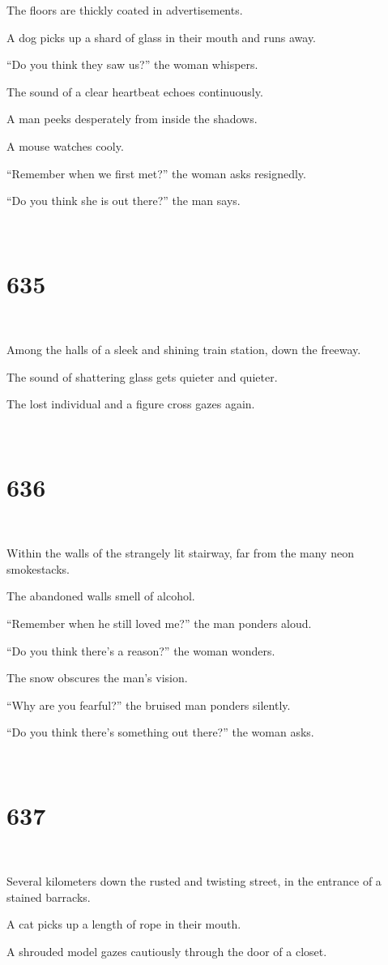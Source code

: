 \documentclass{report}
\begin{document}
The floors are thickly coated in advertisements.

A dog picks up a shard of glass in their mouth and runs away.

``Do you think they saw us?'' the woman whispers.

The sound of a clear heartbeat echoes continuously.

A man peeks desperately from inside the shadows.

A mouse watches cooly.

``Remember when we first met?'' the woman asks resignedly.

``Do you think she is out there?'' the man says.

~
\chapter*{635}
~

Among the halls of a sleek and shining train station, down the freeway.

The sound of shattering glass gets quieter and quieter.

The lost individual and a figure cross gazes again.

~
\chapter*{636}
~

Within the walls of the strangely lit stairway, far from the many neon smokestacks.

The abandoned walls smell of alcohol.

``Remember when he still loved me?'' the man ponders aloud.

``Do you think there's a reason?'' the woman wonders.

The snow obscures the man's vision.

``Why are you fearful?'' the bruised man ponders silently.

``Do you think there's something out there?'' the woman asks.

~
\chapter*{637}
~

Several kilometers down the rusted and twisting street, in the entrance of a stained barracks.

A cat picks up a length of rope in their mouth.

A shrouded model gazes cautiously through the door of a closet.
\end{document}
